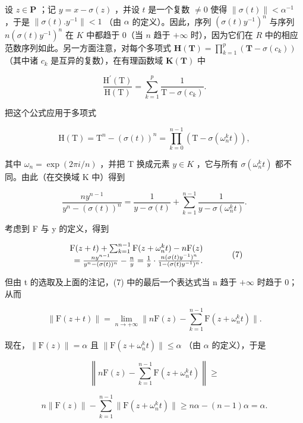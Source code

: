 设 \(z \in \mathbf{P}\) ；记 \(y = x - \sigma(z)\) ，并设 \(t\) 是一个复数 \(\neq 0\) 使得 \(\| \sigma(t) \| < \alpha^{-1}\) ，于是 \(\| \sigma(t).y^{-1} \| < 1\) （由 \(\alpha\) 的定义）。因此，序列 \((\sigma(t)y^{-1})^n\) 与序列 \(n(\sigma(t)y^{-1})^n\) 在 \(K\) 中都趋于 0（当 \(n\) 趋于 \(+\infty\) 时），因为它们在 \(R\) 中的相应范数序列如此。另一方面注意，对每个多项式 \(\mathbf{H}(\mathbf{T}) = \prod_{k=1}^{p} (\mathbf{T} - \sigma(c_k))\) （其中诸 \(c_k\) 是互异的复数），在有理函数域 \(\mathbf{K}(\mathbf{T})\) 中

\[
\frac {\mathrm{H} ^ {\prime} (\mathrm{T})}{\mathrm{H} (\mathrm{T})} = \sum_ {k = 1} ^ {p} \frac {1}{\mathrm{T} - \sigma (c _ {k})}.\tag{5}
\]

把这个公式应用于多项式

\[
\mathrm{H} (\mathrm{T}) = \mathrm{T} ^ {n} - (\sigma (t)) ^ {n} = \prod_ {k = 0} ^ {n - 1} \left(\mathrm{T} - \sigma \left(\omega_ {n} ^ {k} t\right)\right),
\]

其中 \(\omega_{n}=\exp(2\pi i/n)\) ，并把 T 换成元素 \(y\in K\) ，它与所有 \(\sigma(\omega_{n}^{k}t)\) 都不同。由此（在交换域 K 中）得到

\[
\frac {n y ^ {n - 1}}{y ^ {n} - (\sigma (t)) ^ {n}} = \frac {1}{y - \sigma (t)} + \sum_ {k = 1} ^ {n - 1} \frac {1}{y - \sigma \left(\omega_ {n} ^ {k} t\right)}.\tag{6}
\]

考虑到 F 与 y 的定义，得到

\[
\begin{array}{r l} \mathrm{F} (z + t) + \sum_ {k = 1} ^ {n - 1} \mathrm{F} (z + \omega_ {n} ^ {k} t) - n \mathrm{F} (z) & \\ = \frac {n y ^ {n - 1}}{y ^ {n} - (\sigma (t)) ^ {n}} - \frac {n}{y} = \frac {1}{y} \cdot \frac {n (\sigma (t) y ^ {- 1}) ^ {n}}{1 - (\sigma (t) y ^ {- 1}) ^ {n}}. \end{array}\tag{7}
\]

但由 t 的选取及上面的注记，(7) 中的最后一个表达式当 n 趋于 \(+\infty\) 时趋于 0；从而

\[
\| \mathrm{F} (z + t) \| = \lim _ {n \to + \infty} \| n \mathrm{F} (z) - \sum_ {k = 1} ^ {n - 1} \mathrm{F} (z + \omega_ {n} ^ {k} t) \|.\tag{8}
\]

现在，\(\| \mathrm{F}(z)\| = \alpha\) 且 \(\| \mathrm{F}(z + \omega_n^kt)\| \leqslant \alpha\) （由 \(\alpha\) 的定义），于是

\[
\left\| n \mathrm{F} (z) - \sum_ {k = 1} ^ {n - 1} \mathrm{F} (z + \omega_ {n} ^ {k} t) \right\| \geqslant
\]

\[
n \| \mathrm{F} (z) \| - \sum_ {k = 1} ^ {n - 1} \| \mathrm{F} (z + \omega_ {n} ^ {k} t) \| \geqslant n \alpha - (n - 1) \alpha = \alpha .
\]

